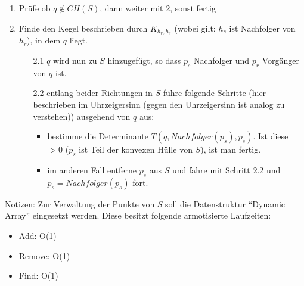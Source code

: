 \documentclass[a4paper]{article}
\begin{document}
\begin{enumerate}

\item Prüfe ob $q \notin CH(S)$, dann weiter mit 2, sonst fertig

\item Finde den Kegel beschrieben durch $K_{h_r,h_s}$ (wobei gilt: $h_s$ ist Nachfolger von $h_r$), in dem $q$ liegt.

\begin{itemize}
	\item[2.1] $q$ wird nun zu $S$ hinzugefügt, so dass $p_s$ Nachfolger und $p_r$ Vorgänger von $q$ ist.
	
	\item[2.2] entlang beider Richtungen in $S$ führe folgende Schritte (hier beschrieben im Uhrzeigersinn (gegen den Uhrzeigersinn ist analog zu verstehen)) ausgehend von $q$ aus:
	
	\begin{itemize}
		\item bestimme die Determinante $T(q, Nachfolger(p_s), p_s)$. Ist diese $>0$ ($p_s$ ist Teil der konvexen Hülle von $S$), ist man fertig.
		\item im anderen Fall entferne $p_s$ aus $S$ und fahre mit Schritt 2.2 und $p_s = Nachfolger(p_s)$ fort. 
	\end{itemize}

\end{itemize}

\end{enumerate}

Notizen:
Zur Verwaltung der Punkte von $S$ soll die Datenstruktur "`Dynamic Array"'
eingesetzt werden. 
Diese besitzt folgende armotisierte Laufzeiten:
\begin{itemize}
 \item Add: O(1)
 \item Remove: O(1)
 \item Find: O(1)
\end{itemize}
\end{document}
